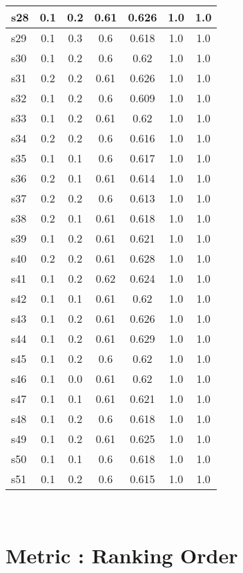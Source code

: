 \documentclass{article}
\begin{document}
\begin{tabular}{|l|c|c|c|c|c|c|}
\hline
s28 &0.1 & 0.2 & 0.61 & 0.626 & 1.0 & 1.0\\
\hline
s29 &0.1 & 0.3 & 0.6 & 0.618 & 1.0 & 1.0\\
\hline
s30 &0.1 & 0.2 & 0.6 & 0.62 & 1.0 & 1.0\\
\hline
s31 &0.2 & 0.2 & 0.61 & 0.626 & 1.0 & 1.0\\
\hline
s32 &0.1 & 0.2 & 0.6 & 0.609 & 1.0 & 1.0\\
\hline
s33 &0.1 & 0.2 & 0.61 & 0.62 & 1.0 & 1.0\\
\hline
s34 &0.2 & 0.2 & 0.6 & 0.616 & 1.0 & 1.0\\
\hline
s35 &0.1 & 0.1 & 0.6 & 0.617 & 1.0 & 1.0\\
\hline
s36 &0.2 & 0.1 & 0.61 & 0.614 & 1.0 & 1.0\\
\hline
s37 &0.2 & 0.2 & 0.6 & 0.613 & 1.0 & 1.0\\
\hline
s38 &0.2 & 0.1 & 0.61 & 0.618 & 1.0 & 1.0\\
\hline
s39 &0.1 & 0.2 & 0.61 & 0.621 & 1.0 & 1.0\\
\hline
s40 &0.2 & 0.2 & 0.61 & 0.628 & 1.0 & 1.0\\
\hline
s41 &0.1 & 0.2 & 0.62 & 0.624 & 1.0 & 1.0\\
\hline
s42 &0.1 & 0.1 & 0.61 & 0.62 & 1.0 & 1.0\\
\hline
s43 &0.1 & 0.2 & 0.61 & 0.626 & 1.0 & 1.0\\
\hline
s44 &0.1 & 0.2 & 0.61 & 0.629 & 1.0 & 1.0\\
\hline
s45 &0.1 & 0.2 & 0.6 & 0.62 & 1.0 & 1.0\\
\hline
s46 &0.1 & 0.0 & 0.61 & 0.62 & 1.0 & 1.0\\
\hline
s47 &0.1 & 0.1 & 0.61 & 0.621 & 1.0 & 1.0\\
\hline
s48 &0.1 & 0.2 & 0.6 & 0.618 & 1.0 & 1.0\\
\hline
s49 &0.1 & 0.2 & 0.61 & 0.625 & 1.0 & 1.0\\
\hline
s50 &0.1 & 0.1 & 0.6 & 0.618 & 1.0 & 1.0\\
\hline
s51 &0.1 & 0.2 & 0.6 & 0.615 & 1.0 & 1.0\\
\hline
\end{tabular}\\

\newpage
\section{Metric : Ranking Order}

\newpage
\end{document}

